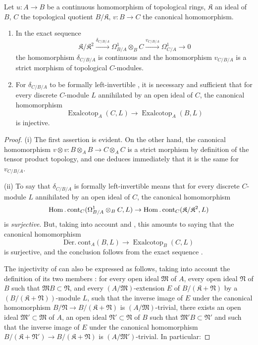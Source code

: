 \begin{proposition}[20.7.8]
\label{0.20.7.8}
Let $u:A\to B$ be a continuous homomorphism of topological rings, $\mathfrak{K}$ an ideal of $B$, $C$ the topological quotient $B/\mathfrak{K}$, $v:B\to C$ the canonical homomorphism.
\begin{enumerate}
  \item[\rm(i)] In the exact sequence \textup{}
\[
  \mathfrak{K}/\mathfrak{K}^2\xrightarrow{\delta_{C/B/A}}\Omega^1_{B/A}\otimes_B C\xrightarrow{v_{C/B/A}}\Omega^1_{C/A}\to 0
\]
the homomorphism $\delta_{C/B/A}$ is continuous and the homomorphism $v_{C/B/A}$ is a strict morphism of topological $C$-modules.
  \item[\rm(ii)] For $\delta_{C/B/A}$ to be formally left-invertible \textup{}, it is necessary and sufficient that for every discrete $C$-module $L$ annihilated by an open ideal of $C$, the canonical homomorphism
\begin{equation}
\tag{20.7.8.1}
  \label{0.20.7.8.1}
  \operatorname{Exalcotop}_A(C,L)\to\operatorname{Exalcotop}_A(B,L)
\end{equation}
is injective.
\end{enumerate}
\end{proposition}

\begin{proof}
(i) The first assertion is evident.
On the other hand, the canonical homomorphism $v\otimes v:B\otimes_A B\to C\otimes_A C$ is a strict morphism by definition of the tensor product topology, and one deduces immediately that it is the same for $v_{C/B/A}$.

(ii) To say that $\delta_{C/B/A}$ is formally left-invertible means that for every discrete $C$-module $L$ annihilated by an open ideal of $C$, the canonical homomorphism
\[
  \operatorname{Hom}.\operatorname{cont}_C(\Omega^1_{B/A}\otimes_B C,L)\to\operatorname{Hom}.\operatorname{cont}_C(\mathfrak{K}/\mathfrak{K}^2,L)
\]
is \emph{surjective}.
But, taking into account  and , this amounts to saying that the canonical homomorphism
\[
  \operatorname{D\acute{e}r.\ cont}_A(B,L)\to\operatorname{Exalcotop}_B(C,L)
\]
is surjective, and the conclusion follows from the exact sequence .

The injectivity of  can also be expressed as follows, taking into account the definition of its two members : for every open ideal $\mathfrak{M}$ of $A$, every open ideal $\mathfrak{N}$ of $B$ such that $\mathfrak{M}B\subset\mathfrak{N}$, and every $(A/\mathfrak{M})$-extension $E$ of $B/(\mathfrak{K}+\mathfrak{N})$ by a $(B/(\mathfrak{K}+\mathfrak{N}))$-module $L$, such that the inverse image of $E$ under the canonical homomorphism $B/\mathfrak{N}\to B/(\mathfrak{K}+\mathfrak{N})$ is $(A/\mathfrak{M})$-trivial, there exists an open ideal $\mathfrak{M}'\subset\mathfrak{M}$ of $A$,
an open ideal $\mathfrak{N}'\subset\mathfrak{N}$ of $B$ such that $\mathfrak{M}'B\subset\mathfrak{N}'$ and such that the inverse image of $E$ under the canonical homomorphism $B/(\mathfrak{K}+\mathfrak{N}')\to B/(\mathfrak{K}+\mathfrak{N})$ is $(A/\mathfrak{M}')$-trivial. In particular:
\end{proof}

